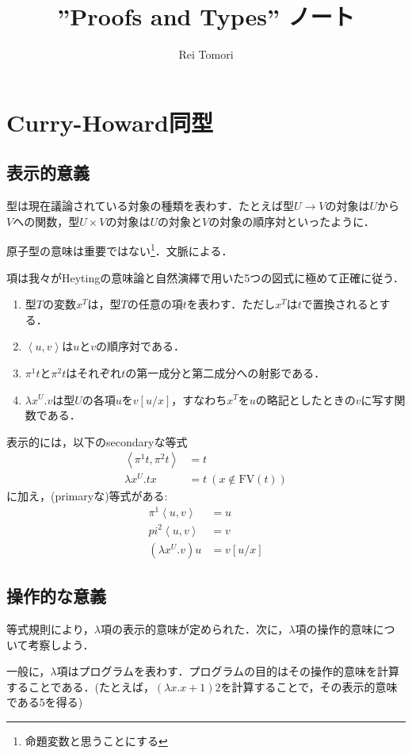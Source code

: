\documentclass[a4paper,10pt,platex, dvipdfmx]{jsarticle}
\title{''Proofs and Types'' ノート}
\author{Rei Tomori}
\begin{document}
\maketitle
\section{Curry-Howard同型}
\subsection{表示的意義}
型は現在議論されている対象の種類を表わす．たとえば型$U \to V$の対象は$U$から$V$への関数，型$U\times V$の対象は$U$の対象と$V$の対象の順序対といったように．

原子型の意味は重要ではない\footnote{命題変数と思うことにする}．文脈による．

項は我々がHeytingの意味論と自然演繹で用いた5つの図式に極めて正確に従う．\begin{enumerate}
\item 型$T$の変数$x^{T}$は，型$T$の任意の項$t$を表わす．ただし$x^{T}$は$t$で置換されるとする．
\item $\left<u, v\right>$は$u$と$v$の順序対である．
\item $\pi^{1}t$と$\pi^{2}t$はそれぞれ$t$の第一成分と第二成分への射影である．
\item $\lambda x^{U}. v$は型$U$の各項$u$を$v\left[u/ x\right]$，すなわち$x^{T}$を$u$の略記としたときの$v$に写す関数である．
\end{enumerate}
表示的には，以下のsecondaryな等式
\begin{eqnarray*}
\left<\pi^{1}t, \pi^{2}t\right> &= t\\
\lambda x^{U} . t x & = t\ (x\notin\mathrm{FV}(t))
\end{eqnarray*}に加え，(primaryな)等式がある:\begin{eqnarray*}
\pi^{1}\left<u, v\right> &= u\\
pi^{2}\left<u, v\right> &= v\\
(\lambda x^{U}. v) u &= v\left[u/x\right]
\end{eqnarray*}
\subsection{操作的な意義}
等式規則により，$\lambda$項の表示的意味が定められた．次に，$\lambda$項の操作的意味について考察しよう．

一般に，$\lambda$項はプログラムを表わす．プログラムの目的はその操作的意味を計算することである．(たとえば，$(\lambda x. x + 1) 2$を計算することで，その表示的意味である5を得る)
\end{document}
